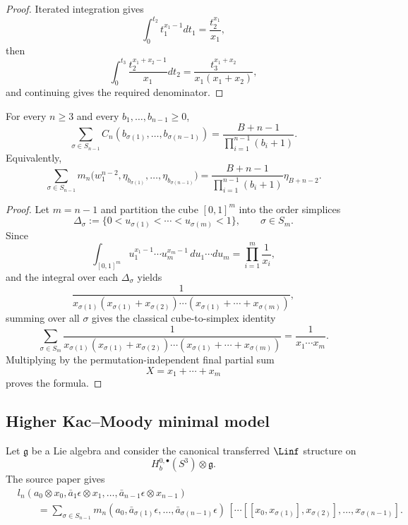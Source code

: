 \begin{proof}
Iterated integration gives
\[
\int_0^{t_2}t_1^{x_1-1}dt_1=\frac{t_2^{x_1}}{x_1},
\]
then
\[
\int_0^{t_3}\frac{t_2^{x_1+x_2-1}}{x_1}dt_2
=
\frac{t_3^{x_1+x_2}}{x_1(x_1+x_2)},
\]
and continuing gives the required denominator.
\end{proof}

\begin{theorem}
\label{thm:cbt-simplex-sum-bf}
\ClaimStatusProvedHere
For every $n\ge3$ and every $b_1,\dots,b_{n-1}\ge0$,
\[
\sum_{\sigma\in S_{n-1}}
C_n(b_{\sigma(1)},\dots,b_{\sigma(n-1)})
=
\frac{B+n-1}{\prod_{i=1}^{n-1}(b_i+1)}.
\]
Equivalently,
\[
\sum_{\sigma\in S_{n-1}}
m_n\bigl(w_1^{n-2},\eta_{b_{\sigma(1)}},\dots,\eta_{b_{\sigma(n-1)}}\bigr)
=
\frac{B+n-1}{\prod_{i=1}^{n-1}(b_i+1)}\eta_{B+n-2}.
\]
\end{theorem}

\begin{proof}
Let $m=n-1$ and partition the cube $[0,1]^m$ into the order simplices
\[
\Delta_\sigma:=\{0<u_{\sigma(1)}<\cdots<u_{\sigma(m)}<1\},
\qquad \sigma\in S_m.
\]
Since
\[
\int_{[0,1]^m}u_1^{x_1-1}\cdots u_m^{x_m-1}\,du_1\cdots du_m
=
\prod_{i=1}^m\frac1{x_i},
\]
and the integral over each $\Delta_\sigma$ yields
\[
\frac{1}{x_{\sigma(1)}(x_{\sigma(1)}+x_{\sigma(2)})\cdots
(x_{\sigma(1)}+\cdots+x_{\sigma(m)})},
\]
summing over all $\sigma$ gives the classical cube-to-simplex identity
\[
\sum_{\sigma\in S_m}
\frac{1}{x_{\sigma(1)}(x_{\sigma(1)}+x_{\sigma(2)})\cdots
(x_{\sigma(1)}+\cdots+x_{\sigma(m)})}
=
\frac{1}{x_1\cdots x_m}.
\]
Multiplying by the permutation-independent final partial sum
\[
X=x_1+\cdots+x_m
\]
proves the formula.
\end{proof}

\subsection{Higher Kac--Moody minimal model}
\label{sec:cbt-higher-km}

Let $\mathfrak g$ be a Lie algebra and consider the canonical transferred $\Linf$ structure on
\[
H_b^{0,\bullet}(S^3)\otimes \mathfrak g.
\]
The source paper gives
\[
\begin{aligned}
&l_n(a_0\otimes x_0,\bar a_1\epsilon\otimes x_1,\dots,\bar a_{n-1}\epsilon\otimes x_{n-1})\\
&\qquad =
\sum_{\sigma\in S_{n-1}}
m_n(a_0,\bar a_{\sigma(1)}\epsilon,\dots,\bar a_{\sigma(n-1)}\epsilon)\,
[\cdots[[x_0,x_{\sigma(1)}],x_{\sigma(2)}],\dots,x_{\sigma(n-1)}].
\end{aligned}
\]

